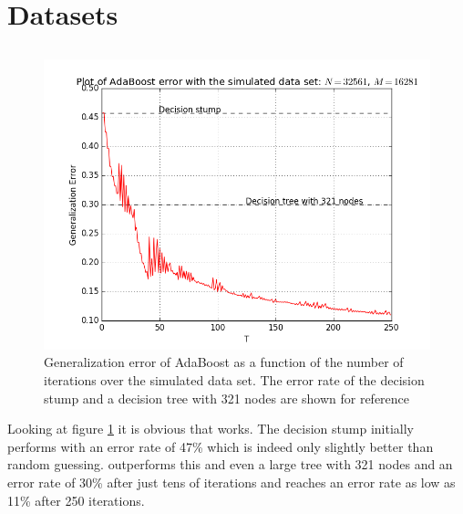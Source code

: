 \section{Datasets}
\subsection{\adaB}
\label{subsec:AdaPracPerf}
\begin{figure}[!ht]
  \centering
      \includegraphics[width=\graphWidth]{generated/ADGD.png}
  \caption{Generalization error of AdaBoost as a function of the number of iterations over the simulated data set. The error rate of the decision stump and a decision tree with 321 nodes are shown for reference}
      \label{fig:adaBGD}
\end{figure}


\par Looking at figure \ref{fig:adaBGD} it is obvious that \adaB works. The decision stump initially performs with an error rate of 47\% which is indeed only slightly better than random guessing. \adaB outperforms this and even a large tree with 321 nodes and an error rate of 30\% after just tens of iterations and reaches an error rate as low as 11\% after 250 iterations. 

